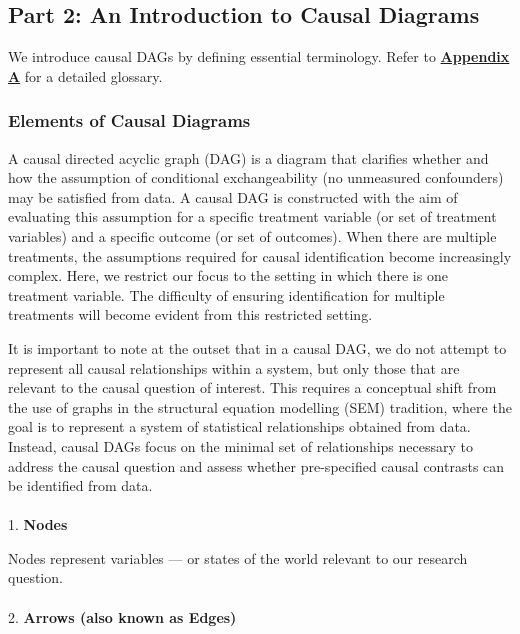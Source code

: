 \documentclass[
  singlecolumn]{article}
\makeatletter
\let\oldparagraph\paragraph
\renewcommand{\paragraph}{
    \@ifstar
      \xxxParagraphStar
      \xxxParagraphNoStar
  }
\newcommand{\xxxParagraphStar}[1]{\oldparagraph*{#1}\mbox{}}
\newcommand{\xxxParagraphNoStar}[1]{\oldparagraph{#1}\mbox{}}
\makeatother
\begin{document}
\subsection{Part 2: An Introduction to Causal
Diagrams}\label{section-part2}

We introduce causal DAGs by defining essential terminology. Refer to
\hyperref[appendix-a]{\textbf{Appendix A}} for a detailed glossary.

\subsubsection{Elements of Causal
Diagrams}\label{elements-of-causal-diagrams}

A causal directed acyclic graph (DAG) is a diagram that clarifies
whether and how the assumption of conditional exchangeability (no
unmeasured confounders) may be satisfied from data. A causal DAG is
constructed with the aim of evaluating this assumption for a specific
treatment variable (or set of treatment variables) and a specific
outcome (or set of outcomes). When there are multiple treatments, the
assumptions required for causal identification become increasingly
complex. Here, we restrict our focus to the setting in which there is
one treatment variable. The difficulty of ensuring identification for
multiple treatments will become evident from this restricted setting.

It is important to note at the outset that in a causal DAG, we do not
attempt to represent all causal relationships within a system, but only
those that are relevant to the causal question of interest. This
requires a conceptual shift from the use of graphs in the structural
equation modelling (SEM) tradition, where the goal is to represent a
system of statistical relationships obtained from data. Instead, causal
DAGs focus on the minimal set of relationships necessary to address the
causal question and assess whether pre-specified causal contrasts can be
identified from data.

\paragraph{\texorpdfstring{1. \textbf{Nodes}}{1. Nodes}}\label{nodes}

Nodes represent variables --- or states of the world relevant to our
research question.

\paragraph{\texorpdfstring{2. \textbf{Arrows (also known as
Edges)}}{2. Arrows (also known as Edges)}}\label{arrows-also-known-as-edges}
\end{document}
